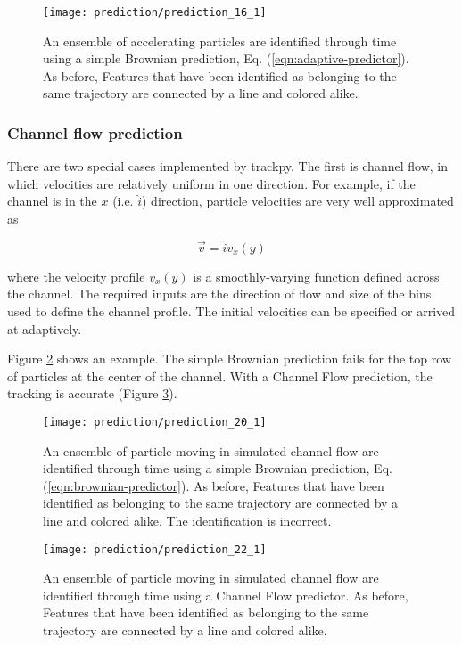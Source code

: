    \begin{figure}
    \centering
    \texttt{[image: prediction/prediction\_16\_1]}
    \caption{\label{fig:prediction-acceleration-adaptive-link}An ensemble of accelerating particles are identified through time using a simple Brownian prediction, Eq. (\ref{eqn:adaptive-predictor}). As before, Features that have been identified as belonging to the same trajectory are connected by a line and colored alike. }
    \end{figure}


    \subsubsection{Channel flow prediction}\label{channel-flow-prediction}

There are two special cases implemented by trackpy. The first is channel flow, in which velocities are relatively uniform in one
direction. For example, if the channel is in the $x$ (i.e. $\hat i$)
direction, particle velocities are very well approximated as

\begin{equation}
\vec v = \hat i v_x(y)
\end{equation}

\noindent where the velocity profile $v_x(y)$ is a smoothly-varying function
defined across the channel. The required inputs are the direction of flow and size of the bins used to
define the channel profile. The initial velocities can be specified or arrived at adaptively.

Figure \ref{fig:prediction-channel-brownian-link} shows an example. The simple Brownian prediction fails for the top row of particles at the center of the channel. With a Channel Flow prediction, the tracking is accurate (Figure \ref{fig:prediction-channel-channel-link}).

   \begin{figure}
    \centering
    \texttt{[image: prediction/prediction\_20\_1]}
    \caption{\label{fig:prediction-channel-brownian-link}An ensemble of particle moving in simulated channel flow are identified through time using a simple Brownian prediction, Eq. (\ref{eqn:brownian-predictor}). As before, Features that have been identified as belonging to the same trajectory are connected by a line and colored alike. The identification is incorrect.}
    \end{figure}

   \begin{figure}
    \centering
    \texttt{[image: prediction/prediction\_22\_1]}
    \caption{\label{fig:prediction-channel-channel-link}An ensemble of particle moving in simulated channel flow are identified through time using a Channel Flow predictor. As before, Features that have been identified as belonging to the same trajectory are connected by a line and colored alike. }
    \end{figure}

